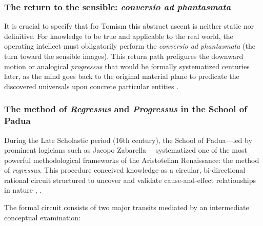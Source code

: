 \documentclass[11pt, a4paper]{article}
\begin{document}
\subsubsection*{The return to the sensible: \textit{conversio ad phantasmata}}
It is crucial to specify that for Tomism this abstract ascent is neither static nor definitive. For knowledge to be true and applicable to the real world, the operating intellect must obligatorily perform the \textrm{\textit{conversio ad phantasmata}} (the turn toward the sensible images). This return path prefigures the downward motion or analogical \textit{progressus} that would be formally systematized centuries later, as the mind goes back to the original material plane to predicate the discovered universals upon concrete particular entities \cite{aquinas_st_conversio}.

\subsubsection*{The method of \textit{Regressus} and \textit{Progressus} in the School of Padua}

During the Late Scholastic period (16th century), the \textrm{School of Padua}---led by prominent logicians such as \textrm{Jacopo Zabarella} \cite{zabarella1578de}---systematized one of the most powerful methodological frameworks of the Aristotelian Renaissance: the method of \textit{regressus}. This procedure conceived knowledge as a circular, bi-directional rational circuit structured to uncover and validate cause-and-effect relationships in nature \cite{randall1940development}, \cite{zabarella2014methods}.

The formal circuit consists of two major transits mediated by an intermediate conceptual examination:
\end{document}
